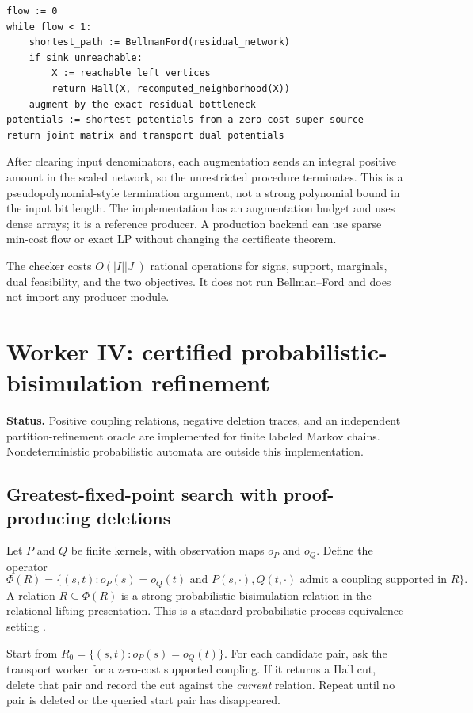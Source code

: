 \documentclass[11pt,letterpaper]{article}
\theoremstyle{definition}\newtheorem{definition}[theorem]{Definition}
\theoremstyle{remark}\newtheorem{remark}[theorem]{Remark}
\newcommand{\status}[1]{\par\noindent\textbf{Status.} #1\par}
\begin{document}
\begin{lstlisting}
flow := 0
while flow < 1:
    shortest_path := BellmanFord(residual_network)
    if sink unreachable:
        X := reachable left vertices
        return Hall(X, recomputed_neighborhood(X))
    augment by the exact residual bottleneck
potentials := shortest potentials from a zero-cost super-source
return joint matrix and transport dual potentials
\end{lstlisting}
After clearing input denominators, each augmentation sends an integral positive amount in the scaled network, so the unrestricted procedure terminates. This is a pseudopolynomial-style termination argument, not a strong polynomial bound in the input bit length. The implementation has an augmentation budget and uses dense arrays; it is a reference producer. A production backend can use sparse min-cost flow or exact LP without changing the certificate theorem.

The checker costs $O(|I||J|)$ rational operations for signs, support, marginals, dual feasibility, and the two objectives. It does not run Bellman--Ford and does not import any producer module.

\section{Worker IV: certified probabilistic-bisimulation refinement}
\status{Positive coupling relations, negative deletion traces, and an independent partition-refinement oracle are implemented for finite labeled Markov chains. Nondeterministic probabilistic automata are outside this implementation.}
\subsection{Greatest-fixed-point search with proof-producing deletions}
Let $P$ and $Q$ be finite kernels, with observation maps $o_P$ and $o_Q$. Define the operator
\[
 \Phi(R)=\{(s,t):o_P(s)=o_Q(t)\text{ and }P(s,\cdot),Q(t,\cdot)
                   \text{ admit a coupling supported in }R\}.
\]
A relation $R\subseteq\Phi(R)$ is a strong probabilistic bisimulation relation in the relational-lifting presentation. This is a standard probabilistic process-equivalence setting \cite{larsen-skou}.

Start from $R_0=\{(s,t):o_P(s)=o_Q(t)\}$. For each candidate pair, ask the transport worker for a zero-cost supported coupling. If it returns a Hall cut, delete that pair and record the cut against the \emph{current} relation. Repeat until no pair is deleted or the queried start pair has disappeared.
\end{document}
